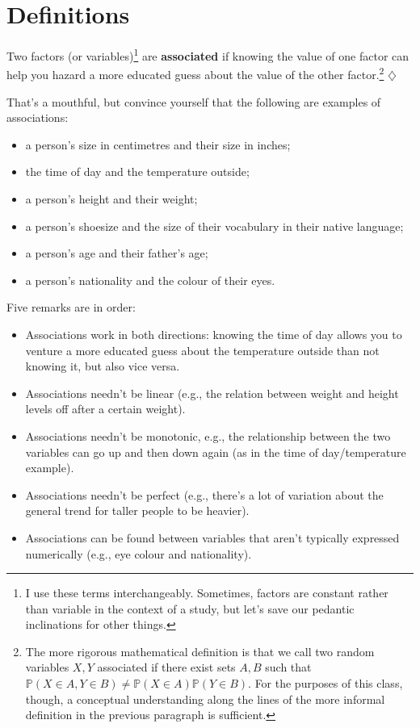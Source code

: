 \documentclass[a4paper]{tufte-book}\usepackage[]{graphicx}\usepackage[]{xcolor}
\newcommand{\term}[1]{\textbf{#1}}
\newcommand*{\parend}[1][$\diamondsuit$]{%
\leavevmode\unskip\penalty9999 \hbox{}\nobreak\hfill
    \quad\hbox{#1}%
}
\begin{document}
\section{Definitions}
\label{def:association}
Two factors (or variables)\footnote{I use these terms interchangeably. 
Sometimes, factors are constant rather than variable in the context of a study, 
but let's save our pedantic inclinations for other things.} 
are \term{associated} if knowing the value of one factor
can help you hazard a more educated guess about the value of the other factor.\footnote{The 
more rigorous mathematical definition is that we call two random variables
$X, Y$ associated if there exist sets $A, B$ such that 
$\mathbb{P}(X \in A, Y \in B) \neq \mathbb{P}(X \in A)\mathbb{P}(Y \in B)$.
For the purposes of this class, though, a conceptual understanding
along the lines of the more informal definition in the previous paragraph
is sufficient.}
\parend
\medskip

That's a mouthful, but convince yourself that the following are examples of associations:

\begin{itemize}
 \item a person's size in centimetres and their size in inches;
 \item the time of day and the temperature outside;
 \item a person's height and their weight;
 \item a person's shoesize and the size of their vocabulary in their native language;
 \item a person's age and their father's age;
 \item a person's nationality and the colour of their eyes.
\end{itemize}

\medskip

Five remarks are in order:

\begin{itemize}
  \item Associations work in both directions: knowing the time of day
allows you to venture a more educated guess about the temperature outside
than not knowing it, but also vice versa.

  \item Associations needn't be linear 
  (e.g., the relation between weight and height levels off after a certain weight).

  \item Associations needn't be monotonic, 
  e.g., the relationship between the two variables can go up and then down again (as in the time of day/temperature example).

  \item Associations needn't be perfect 
  (e.g., there's a lot of variation about the general trend for taller people to be heavier).

  \item Associations can be found between variables that aren't typically expressed numerically 
  (e.g., eye colour and nationality).
\end{itemize}
\end{document}
